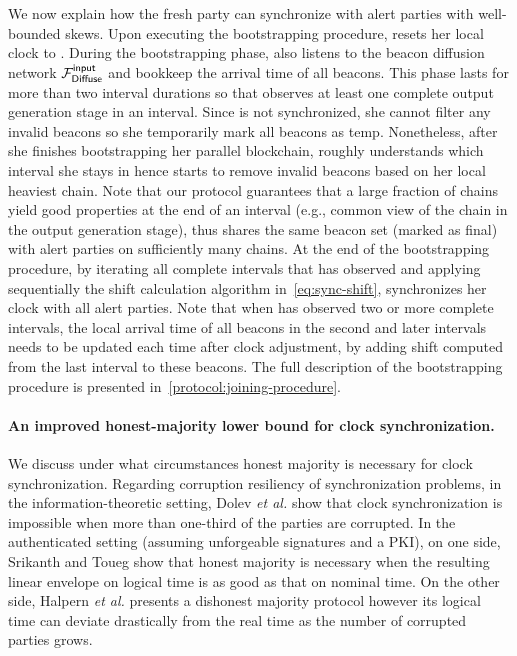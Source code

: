 We now explain how the fresh party \newParty can synchronize with alert parties with well-bounded skews.
%
Upon executing the bootstrapping procedure, \newParty resets her local clock to .
%
During the bootstrapping phase, \newParty also listens to the beacon diffusion network $\mathcal{F}_{\textsf{Diffuse}}^{\textsf{input}}$ and bookkeep the arrival time of all beacons.
%
This phase lasts for more than two interval durations so that \newParty observes at least one complete output generation stage in an interval.
%
Since \newParty is not synchronized, she cannot filter any invalid beacons so she temporarily mark all beacons as \textsf{temp}.
%
Nonetheless, after she finishes bootstrapping her parallel blockchain, \newParty roughly understands which interval she stays in hence \newParty starts to remove invalid beacons based on her local heaviest chain.
%
Note that our protocol guarantees that a large fraction of chains yield good properties at the end of an interval (e.g., common view of the chain in the output generation stage), \newParty thus shares the same beacon set (marked as \textsf{final}) with alert parties on sufficiently many chains.
%
At the end of the bootstrapping procedure, by iterating all complete intervals that \newParty has observed and applying sequentially the shift calculation algorithm in~\cref{eq:sync-shift}, \newParty synchronizes her clock with all alert parties.
%
Note that when \newParty has observed two or more complete intervals, the local arrival time of all beacons in the second and later intervals needs to be updated each time after clock adjustment, by adding shift computed from the last interval to these beacons.
%
The full description of the bootstrapping procedure is presented in~\cref{protocol:joining-procedure}.

\paragraph{An improved honest-majority lower bound for clock synchronization.}
%
We discuss under what circumstances honest majority is necessary for clock synchronization.
%
Regarding corruption resiliency of synchronization problems, in the information-theoretic setting, Dolev \textit{et al.} \cite{JCSS:DHS86} show that clock synchronization is impossible when more than one-third of the parties are corrupted.
%
In the authenticated setting (assuming unforgeable signatures and a PKI), on one side, Srikanth and Toueg \cite{JACM:SriTou87} show that honest majority is necessary when the resulting linear envelope on logical time is as good as that on nominal time.
%
On the other side, Halpern \textit{et al.} \cite{PODC:HSSD84} presents a dishonest majority protocol however its logical time can deviate drastically from the real time as the number of corrupted parties grows.

